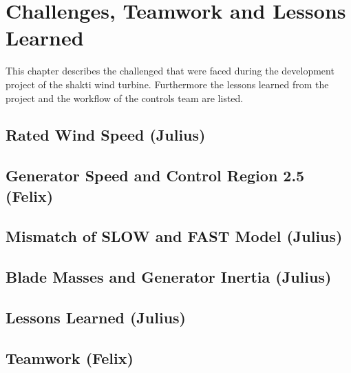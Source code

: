 \chapter{Challenges, Teamwork and Lessons Learned} \label{Challenges}
This chapter describes the challenged that were faced during the development project of the \gls{shakti} wind turbine. Furthermore the lessons learned from the project and the workflow of the controls team are listed.
\section{Rated Wind Speed (Julius)} \label{RatedWindSpeed}


\section{Generator Speed and Control Region 2.5 (Felix)} \label{Region2d5}


\section{Mismatch of SLOW and FAST Model (Julius)}


\section{Blade Masses and Generator Inertia (Julius)}


\section{Lessons Learned (Julius)}


\section{Teamwork (Felix)}



